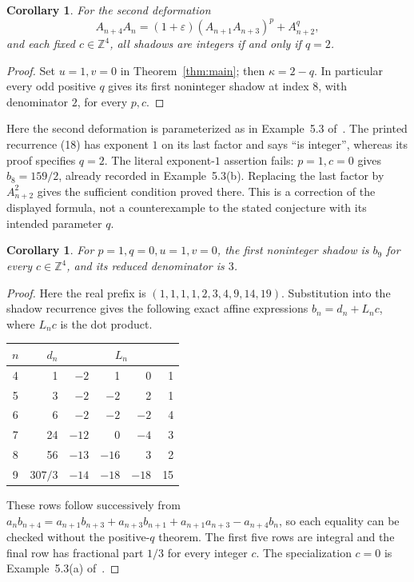\documentclass[11pt]{article}
\newtheorem{corollary}[theorem]{Corollary}
\newcommand{\ZZ}{\mathbb Z}
\newcommand{\eps}{\varepsilon}
\begin{document}
\begin{corollary}\label{cor:second}
For the second deformation
\[
 A_{n+4}A_n=(1+\eps)(A_{n+1}A_{n+3})^p+A_{n+2}^q,
\]
and each fixed $c\in\ZZ^4$, all shadows are integers if and only if
$q=2$.
\end{corollary}
\begin{proof}
Set $u=1,v=0$ in Theorem~\ref{thm:main}; then $\kappa=2-q$.
In particular every odd positive $q$ gives its first noninteger shadow
at index $8$, with denominator $2$, for every $p,c$.
\end{proof}
Here the second deformation is parameterized as in Example~5.3
of~\cite{OT}. The printed recurrence (18) has exponent $1$ on its
last factor and says ``is integer'', whereas its proof specifies
$q=2$. The literal exponent-$1$ assertion fails: $p=1,c=0$ gives
$b_8=159/2$, already recorded in Example~5.3(b). Replacing the last
factor by $A_{n+2}^2$ gives the sufficient condition proved there.
This is a correction of the displayed formula, not a counterexample
to the stated conjecture with its intended parameter $q$.

\begin{corollary}\label{cor:zero}
For $p=1,q=0,u=1,v=0$, the first noninteger shadow is $b_9$ for
every $c\in\ZZ^4$, and its reduced denominator is $3$.
\end{corollary}
\begin{proof}
Here the real prefix is $(1,1,1,1,2,3,4,9,14,19)$.
Substitution into the shadow recurrence gives the following exact
affine expressions $b_n=d_n+L_nc$, where $L_nc$ is the dot product.
\begin{center}\small
\begin{tabular}{@{}crrrrr@{}}
\toprule
$n$ & $d_n$ & \multicolumn{4}{c}{$L_n$}\\
\midrule
4 & 1 & $-2$ & 1 & 0 & 1\\
5 & 3 & $-2$ & $-2$ & 2 & 1\\
6 & 6 & $-2$ & $-2$ & $-2$ & 4\\
7 & 24 & $-12$ & 0 & $-4$ & 3\\
8 & 56 & $-13$ & $-16$ & 3 & 2\\
9 & $307/3$ & $-14$ & $-18$ & $-18$ & 15\\
\bottomrule
\end{tabular}
\end{center}
These rows follow successively from
$a_nb_{n+4}=a_{n+1}b_{n+3}+a_{n+3}b_{n+1}
+a_{n+1}a_{n+3}-a_{n+4}b_n$, so each equality can be checked
without the positive-$q$ theorem. The first five rows are integral
and the final row has fractional part $1/3$ for every integer $c$.
The specialization $c=0$ is Example~5.3(a) of~\cite{OT}.
\end{proof}
\end{document}
